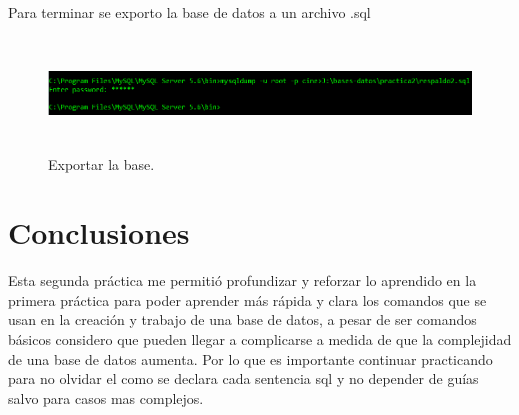 \documentclass[12pt, titlepage]{article}
\begin{document}
    Para terminar se exporto la base de datos a un archivo .sql
    \begin{figure}[H]
        \begin{center}
            \includegraphics[width=16cm, height=3cm]{img/exportacion.png}
            \caption{Exportar la base.}
            \label{fig:exportacion}
        \end{center}
    \end{figure}
    \section{Conclusiones}
        Esta segunda práctica me permitió profundizar y reforzar lo aprendido en la primera práctica para poder aprender más rápida y clara los comandos que se usan en la creación y trabajo de una base de datos, a pesar de ser comandos básicos considero que pueden llegar a complicarse a medida de que la complejidad de una base de datos aumenta. Por lo que es importante continuar practicando para no olvidar el como se declara cada sentencia sql y no depender de guías salvo para casos mas complejos.
     
    
\end{document}
